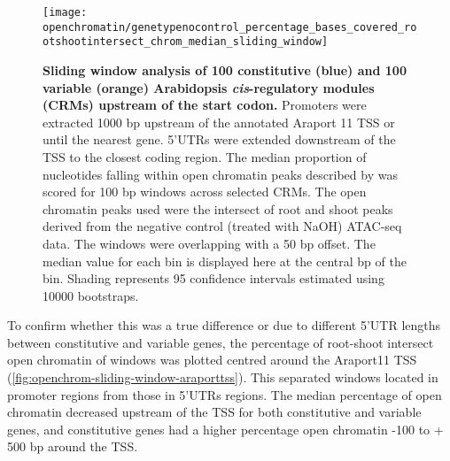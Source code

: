 \documentclass[../main.tex]{subfiles}
\begin{document}
\begin{figure}[!hbt]
	\begin{center}
		\capstart
		\texttt{[image: openchromatin/genetypenocontrol\_percentage\_bases\_covered\_rootshootintersect\_chrom\_median\_sliding\_window]}
		\caption{
			\textbf{Sliding window analysis of 100 constitutive (blue) and 100 variable (orange) Arabidopsis \textit{cis}\hyp{}regulatory modules (CRMs) upstream of the start codon.}
			Promoters were extracted 1000 bp upstream of the annotated Araport 11 \autocite{chengAraport11CompleteReannotation2017} TSS or until the nearest gene.
			5'UTRs were extended downstream of the TSS to the closest coding region.
			The median proportion of nucleotides falling within open chromatin peaks described by \textcite{potterCytokininModulatesContextdependent2018} was scored for 100 bp windows across selected CRMs.
			The open chromatin peaks used were the intersect of root and shoot peaks derived from the negative control (treated with NaOH) ATAC\hyp{}seq data.
			The windows were overlapping with a 50 bp offset.
			The median value for each bin is displayed here at the central bp of the bin.
			Shading represents 95 confidence intervals estimated using 10000 bootstraps.		
			\label{fig:openchrom-sliding-window}
		}
	\end{center}
\end{figure}

To confirm whether this was a true difference or due to different 5'UTR lengths between constitutive and variable genes, the percentage of root\hyp{}shoot intersect open chromatin of windows was plotted centred around the Araport11 TSS (\autoref{fig:openchrom-sliding-window-araporttss}).
This separated windows located in promoter regions from those in 5'UTRs regions.
The median percentage of open chromatin decreased upstream of the TSS for both constitutive and variable genes, and constitutive genes had a higher percentage open chromatin -100 to + 500 bp around the TSS.
\end{document}
